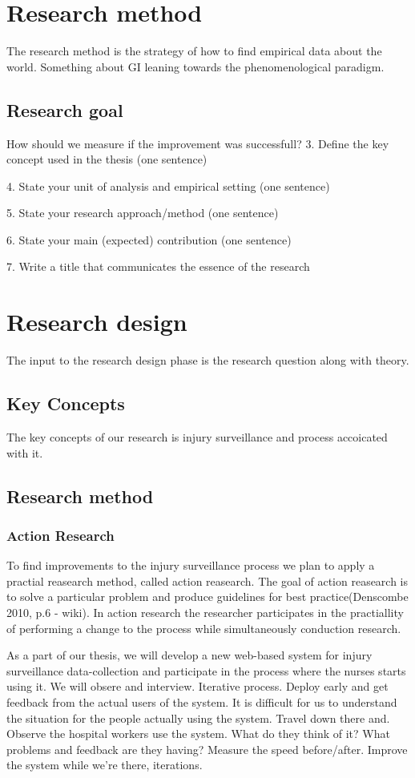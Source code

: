 \documentclass[UKenglish, 12pt]{article}
\begin{document}
\section*{Research method}
The research method is the strategy of how to find empirical data about the world. Something about GI leaning towards the phenomenological paradigm.
\subsection{Research goal}
How should we measure if the improvement was successfull?
3. Define the key concept used in the thesis (one sentence)

4. State your unit of analysis and empirical setting (one sentence)

5. State your research approach/method (one sentence)

6. State your main (expected) contribution (one sentence)

7. Write a title that communicates the essence of the research

\section{Research design}
The input to the research design phase is the research question along with theory.

\subsection{Key Concepts}
The key concepts of our research is injury surveillance and process accoicated with it.

\subsection*{Research method}
\subsubsection*{Action Research}
To find improvements to the injury surveillance process we plan to apply a practial reasearch method, called action reasearch. The goal of action reasearch is to solve a particular problem and produce guidelines for best practice(Denscombe 2010, p.6 - wiki). In action research the researcher participates in the practiallity of performing a change to the process while simultaneously conduction research.

As a part of our thesis, we will develop a new web-based system for injury surveillance data-collection and participate in the process where the nurses starts using it. We will obsere and interview. Iterative process. Deploy early and get feedback from the actual users of the system. It is difficult for us to understand the situation for the people actually using the system. Travel down there and. Observe the hospital workers use the system. What do they think of it? What problems and feedback are they having? Measure the speed before/after. Improve the system while we're there, iterations.
\end{document}
